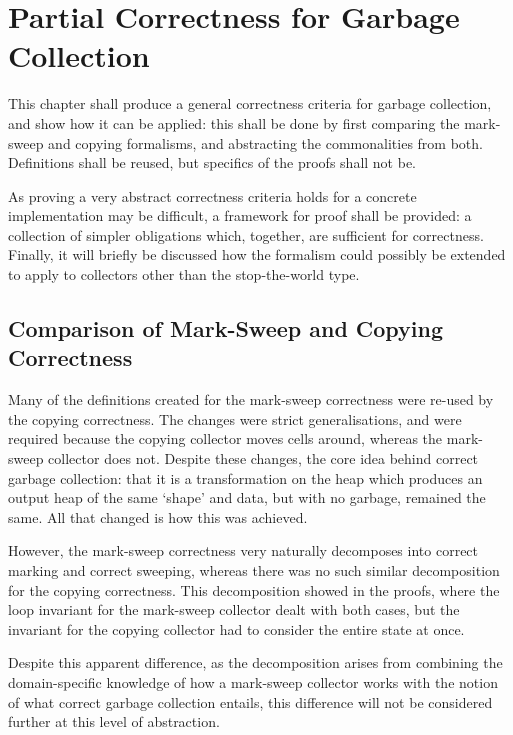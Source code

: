 \chapter{Partial Correctness for Garbage Collection}
\label{sec:gc}

This chapter shall produce a general correctness criteria for garbage
collection, and show how it can be applied: this shall be done by
first comparing the mark-sweep and copying formalisms, and abstracting
the commonalities from both. Definitions shall be reused, but
specifics of the proofs shall not be.

As proving a very abstract correctness criteria holds for a concrete
implementation may be difficult, a framework for proof shall be
provided: a collection of simpler obligations which, together, are
sufficient for correctness. Finally, it will briefly be discussed how
the formalism could possibly be extended to apply to collectors other
than the stop-the-world type.

\section{Comparison of Mark-Sweep and Copying Correctness}
\label{sec:gc-comparison}

Many of the definitions created for the mark-sweep correctness were
re-used by the copying correctness. The changes were strict
generalisations, and were required because the copying collector moves
cells around, whereas the mark-sweep collector does not. Despite these
changes, the core idea behind correct garbage collection: that it is
a transformation on the heap which produces an output heap of the same
`shape' and data, but with no garbage, remained the same. All that
changed is how this was achieved.

However, the mark-sweep correctness very naturally decomposes into
correct marking and correct sweeping, whereas there was no such
similar decomposition for the copying correctness. This decomposition
showed in the proofs, where the loop invariant for the mark-sweep
collector dealt with both cases, but the invariant for the copying
collector had to consider the entire state at once.

Despite this apparent difference, as the decomposition arises from
combining the domain-specific knowledge of how a mark-sweep collector
works with the notion of what correct garbage collection entails, this
difference will not be considered further at this level of
abstraction.

